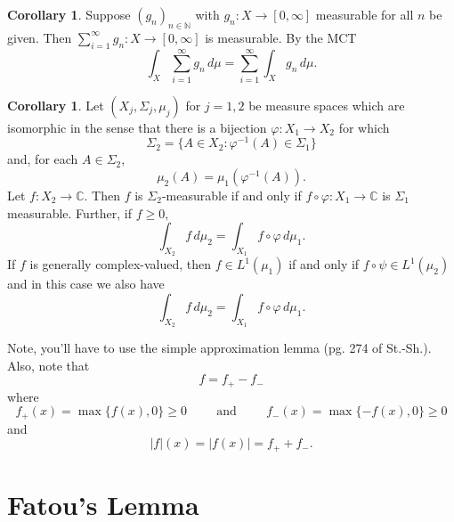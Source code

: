 \documentclass{article}
\theoremstyle{definition}
\theoremstyle{theorem}
\newtheorem{corollary}[theorem]{Corollary}
\begin{document}
\begin{corollary}
Suppose $(g_n)_{n\in \mathbb{N}}$ with $g_n : X \to [0,\infty]$ measurable for all $n$ be given. Then  $\sum^\infty_{i=1}g_n : X \to [0, \infty]$ is measurable. By the MCT
\begin{equation*}
    \int_X \sum^\infty_{i=1} g_n \,d\mu = \sum^\infty_{i=1} \int_X g_n \,d\mu.
\end{equation*}
\end{corollary}


\begin{corollary}
Let $(X_j,\Sigma_j,\mu_j)$ for $j=1,2$ be measure spaces which are isomorphic in the sense that there is a bijection $\varphi:X_1\to X_2$ for which
\begin{equation*}
\Sigma_2=\{A\in X_2:\varphi^{-1}(A)\in\Sigma_1\}
\end{equation*}
and, for each $A\in\Sigma_2$,
\begin{equation*}
\mu_2(A)=\mu_1(\varphi^{-1}(A)).
\end{equation*}
Let $f:X_2\to\mathbb{C}$. Then $f$ is $\Sigma_2$-measurable if and only if $f\circ \varphi:X_1\to\mathbb{C}$ is $\Sigma_1$ measurable. Further, if $f\geq 0$,
\begin{equation*}
\int_{X_2}f\,d\mu_2=\int_{X_1}f\circ \varphi\,d\mu_1.
\end{equation*}
If $f$ is generally complex-valued, then $f\in L^1(\mu_1)$ if and only if $f\circ \psi\in L^1(\mu_2)$ and in this case we also have
\begin{equation*}
\int_{X_2}f\,d\mu_2=\int_{X_1}f\circ \varphi\,d\mu_1.
\end{equation*}
\end{corollary}
Note, you'll have to use the simple approximation lemma (pg. 274 of St.-Sh.). Also, note that 
\begin{equation*}
f=f_+-f_-
\end{equation*}
where
\begin{equation*}
f_+(x)=\max\{f(x),0\}\geq 0\hspace{1cm}\mbox{and}\hspace{1cm}f_-(x)=\max\{-f(x),0\}\geq 0
\end{equation*}
and
\begin{equation*}
|f|(x)=|f(x)|=f_++f_-.
\end{equation*}



\section{Fatou's Lemma}
\end{document}
